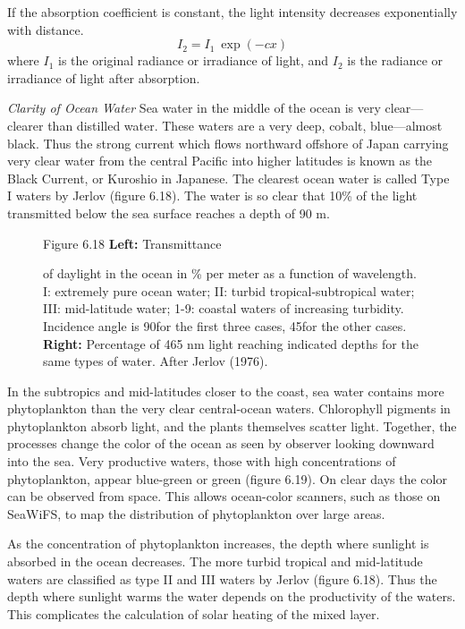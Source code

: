 If the absorption coefficient is constant, the light intensity decreases
exponentially with distance.
\begin{equation}
I_2 = I_1 \: \exp(-cx)
\end{equation}
where  $I_1$ is the original radiance or irradiance of light, and $I_2$
is the radiance or irradiance of light after absorption.

\textit{Clarity of Ocean Water} Sea water in the middle of the
ocean is very clear---clearer than distilled water. These waters are a very deep, cobalt,
blue---almost black. Thus the strong current which flows northward offshore of Japan carrying
very clear water from the central Pacific into higher latitudes is known as the Black Current,
or Kuroshio in Japanese. The clearest ocean water is called Type I waters by
Jerlov (figure 6.18). The water is so clear that 10\% of the light transmitted below the sea
surface reaches a depth of 90 m.

\begin{figure}[t!]
\footnotesize
Figure 6.18 \textbf{Left:} Transmittance \rule{0mm}{3ex}of daylight in the ocean in \% per
meter as a function of wavelength. I: extremely pure ocean water; II: turbid
tropical-subtropical water; III: mid-latitude water; 1-9: coastal waters of increasing
turbidity. Incidence angle is 90\degrees for the first three cases, 45\degrees for the other
cases. \textbf{Right:} Percentage of 465 nm light reaching indicated depths for the same types
of water. After Jerlov (1976).
\label{fig:jerlov}
\vspace{-3ex}
\end{figure}

In the subtropics and mid-latitudes closer to the coast, sea water contains more
phytoplankton than the very clear central-ocean waters. Chlorophyll pigments in
phytoplankton absorb light, and the plants themselves scatter light. Together,
the processes change the color of the ocean as seen by observer looking
downward into the sea. Very productive waters, those with high concentrations of
phytoplankton, appear blue-green or green (figure 6.19). On clear days the color
can be observed from space. This allows ocean-color scanners, such as those on
SeaWiFS, to map the distribution of phytoplankton over large areas.

As the concentration of phytoplankton increases, the depth where sunlight is
absorbed in the ocean decreases. The more turbid tropical and mid-latitude
waters are classified as type II and III waters by Jerlov (figure 6.18). Thus
the depth where sunlight warms the water depends on the productivity of the
waters. This complicates the calculation of solar heating of the mixed layer.

